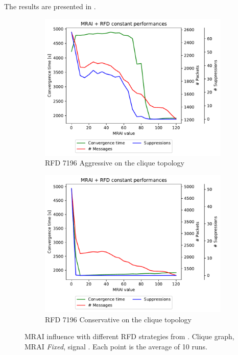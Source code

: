 The results are presented in .

\begin{figure}[h]
     \centering
     \begin{subfigure}[b]{0.49\textwidth}
         \centering
         \includegraphics[width=\textwidth]{images/RFD/clique/cisco_clique10_RFD_7196_aggressive-constant_mrai_rfd_evolution.pdf}
         \caption{RFD 7196 Aggressive on the clique topology}
         \label{fig:rfd7196aggressive}
     \end{subfigure}
     \hfill
     \begin{subfigure}[b]{0.49\textwidth}
         \centering
         \includegraphics[width=\textwidth]{images/RFD/clique/cisco_clique10_RFD_7196_conservative-constant_mrai_rfd_evolution.pdf}
         \caption{RFD 7196 Conservative on the clique topology}
         \label{fig:rfd7196conservative}
     \end{subfigure}
		\caption{\ac{MRAI} influence with different RFD strategies from \cite{rfc7196}.
		Clique graph, \ac{MRAI} \textit{Fixed}, signal .
		Each point is the average of \num{10} runs.}
        \label{fig:clique_rfd7196}
\end{figure}

